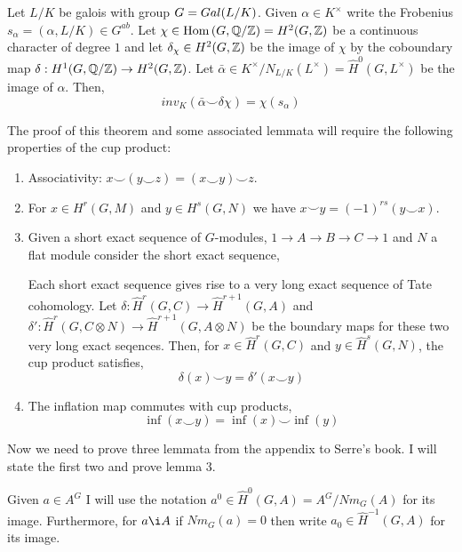 \documentclass[12pt]{extarticle}
\begin{document}
 
\section{} 
\begin{theorem}
Let $L/K$ be galois with group $G = Gal \small(L/K \small)$. Given $\alpha \in K^\times$ write the Frobenius $s_\alpha = (\alpha, L/K) \in G^{ab}$. Let $\chi \in \mathrm{Hom}\left(G, \mathbb{Q}/\mathbb{Z}\right) = H^2(G, \mathbb{Z})$ be a continuous character of degree $1$ and let $\delta_\chi \in H^2(G, \mathbb{Z})$ be the image of $\chi$ by the coboundary map $\delta : H^1(G, \mathbb{Q}/\mathbb{Z}) \to H^2(G, \mathbb{Z})$. Let $\bar{\alpha} \in K^\times / N_{L/K}(L^\times) = \hat{H}^0(G, L^\times)$ be the image of $\alpha$. Then, 
\[ inv_K(\bar{\alpha} \smile \delta \chi) = \chi(s_\alpha) \]
\end{theorem}
\noindent
The proof of this theorem and some associated lemmata will require the following properties of the cup product:
\begin{enumerate}
\item Associativity: $x \smile (y \smile z) = (x \smile y) \smile z$. 
\item For $x \in H^r(G, M)$ and $y \in H^s(G, N)$ we have $x \smile y = (-1)^{rs} (y \smile x)$.
\item Given a short exact sequence of $G$-modules, $1 \to A \to B \to C \to 1$ and $N$ a flat module consider the short exact sequence, 
\begin{center}
\end{center} 
Each short exact sequence gives rise to a very long exact sequence of Tate cohomology. Let $\delta : \hat{H}^r(G, C) \to \hat{H}^{r+1}(G, A)$ and $\delta' : \hat{H}^r(G, C \otimes N) \to \hat{H}^{r+1}(G, A \otimes N)$ be the boundary maps for these two very long exact seqences. Then, for $x \in \hat{H}^r(G, C)$ and $y \in \hat{H}^s(G, N)$, the cup product satisfies,
\[ \delta(x) \smile y = \delta'(x \smile y) \]
\item The inflation map commutes with cup products,
\[ \inf(x \smile y) = \inf(x) \smile \inf(y) \]
\end{enumerate}
Now we need to prove three lemmata from the appendix to Serre's book. I will state the first two and prove lemma 3. 

\begin{remark}
Given $a \in A^G$ I will use the notation $a^0 \in \hat{H}^0(G,A) = A^G / Nm_G(A)$ for its image. Furthermore, for $a \i A$ if $Nm_G(a) = 0$ then write $a_0 \in \hat{H}^{-1}(G, A)$ for its image.  
\end{remark}
\end{document}
